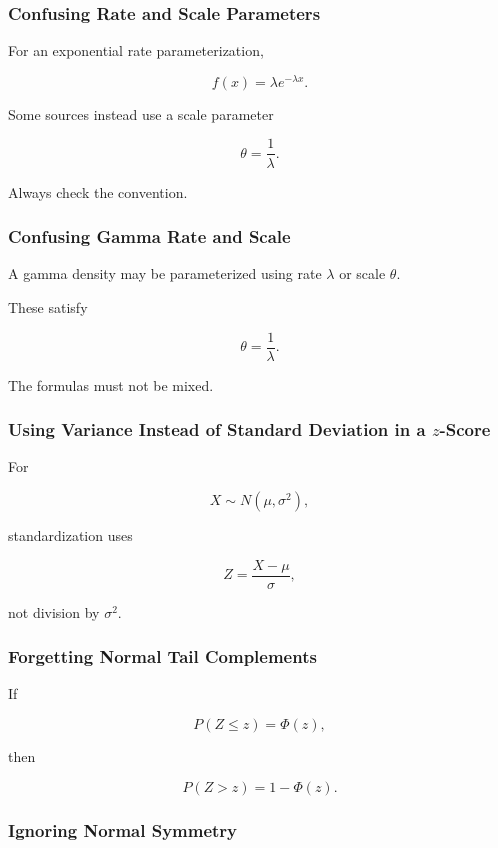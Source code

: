 \subsubsection{Confusing Rate and Scale Parameters}

For an exponential rate parameterization,

\[
f(x)=\lambda e^{-\lambda x}.
\]

Some sources instead use a scale parameter

\[
\theta=\frac1\lambda.
\]

Always check the convention.

\subsubsection{Confusing Gamma Rate and Scale}

A gamma density may be parameterized using rate \(\lambda\) or scale
\(\theta\).

These satisfy

\[
\boxed{
\theta=\frac1\lambda.
}
\]

The formulas must not be mixed.

\subsubsection{Using Variance Instead of Standard Deviation in a \(z\)-Score}

For

\[
X\sim N(\mu,\sigma^2),
\]

standardization uses

\[
\boxed{
Z=\frac{X-\mu}{\sigma},
}
\]

not division by \(\sigma^2\).

\subsubsection{Forgetting Normal Tail Complements}

If

\[
P(Z\leq z)=\Phi(z),
\]

then

\[
\boxed{
P(Z>z)=1-\Phi(z).
}
\]

\subsubsection{Ignoring Normal Symmetry}

